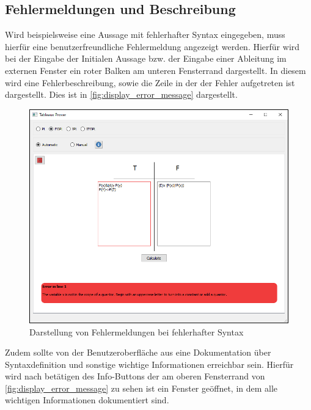\subsection{Fehlermeldungen und Beschreibung}
Wird beispielsweise eine Aussage mit fehlerhafter Syntax eingegeben, muss hierfür eine benutzerfreundliche Fehlermeldung angezeigt werden. Hierfür wird bei der Eingabe der Initialen Aussage bzw. der Eingabe einer Ableitung im externen Fenster ein roter Balken am unteren Fensterrand dargestellt. In diesem wird eine Fehlerbeschreibung, sowie die Zeile in der der Fehler aufgetreten ist dargestellt. Dies ist in \autoref{fig:display_error_message} dargestellt.

\begin{figure}[h]
\begin{center}
\includegraphics[scale=0.8]{images/display_error_message.png}
\caption{Darstellung von Fehlermeldungen bei fehlerhafter Syntax}
\label{fig:display_error_message}
\end{center}
\end{figure}

Zudem sollte von der Benutzeroberfläche aus eine Dokumentation über Syntaxdefinition und sonstige wichtige Informationen erreichbar sein. Hierfür wird nach betätigen des Info-Buttons der am oberen Fensterrand von \autoref{fig:display_error_message} zu sehen ist ein Fenster geöffnet, in dem alle wichtigen Informationen dokumentiert sind.